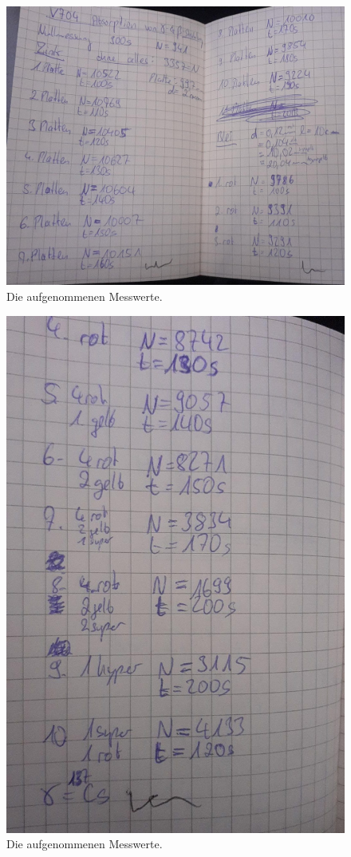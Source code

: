 \begin{figure}[H]
  \centering
  \includegraphics[width=12cm]{content/mess1.jpg}
  \caption{Die aufgenommenen Messwerte.}
  \label{fig:mess1}
\end{figure}
\begin{figure}[H]
  \centering
  \includegraphics[width=12cm]{content/mess2.jpg}
  \caption{Die aufgenommenen Messwerte.}
  \label{fig:mess2}
\end{figure}

